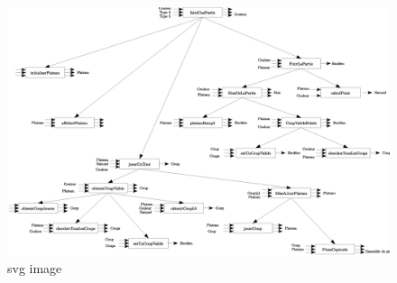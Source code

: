 \begin{figure}[h]
  \centering
  \includegraphics[scale = 0.2]{Analyse_descendante.eps}
  \caption{svg image}
\end{figure}